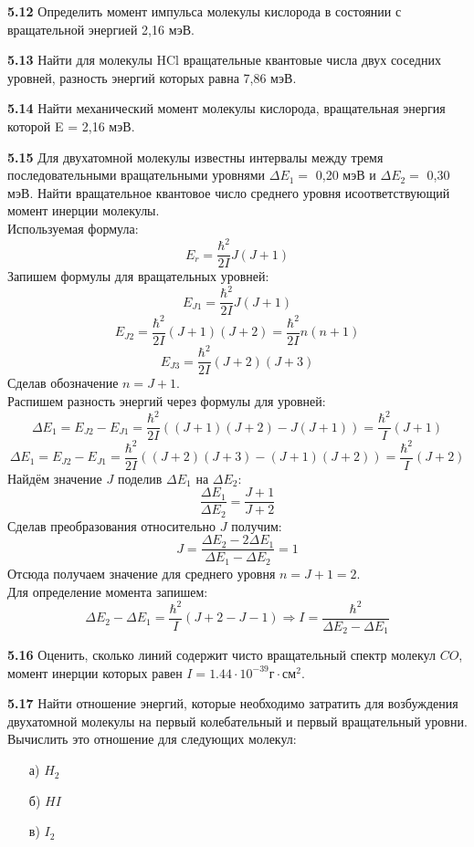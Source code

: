 	\textbf{5.12 }
		Определить момент импульса молекулы кислорода в состоянии с
		вращательной энергией 2,16 мэВ.

	\textbf{5.13 }
		Найти для молекулы HCl вращательные квантовые числа двух соседних
		уровней, разность энергий которых равна 7,86 мэВ.

	\textbf{5.14 }
		Найти механический момент молекулы кислорода, вращательная энергия
		которой E = 2,16 мэВ.

	\textbf{5.15 }
		Для двухатомной молекулы известны интервалы между тремя
		последовательными вращательными уровнями \( \Delta E_1 = \) 0,20 мэВ и
		\(\Delta E_2 = \) 0,30 мэВ. Найти вращательное квантовое число 
		среднего уровня исоответствующий момент инерции молекулы. \\
		Используемая формула: \[ E_r = \frac{\hbar^2}{2I}J(J+1) \]
		Запишем формулы для вращательных уровней:
		\[ E_{J1} = \frac{\hbar^2}{2I}J(J+1) \]
		\[ E_{J2} = \frac{\hbar^2}{2I}(J+1)(J+2) = \frac{\hbar^2}{2I}n(n+1) \]
		\[ E_{J3} = \frac{\hbar^2}{2I}(J+2)(J+3) \]
		Сделав обозначение \( n = J + 1 \). \\
		Распишем разность энергий через формулы для уровней:
		\[ 
			\Delta E_1 = E_{J2} - E_{J1} = 
			\frac{\hbar^2}{2I}((J+1)(J+2) - J(J+1)) = \frac{\hbar^2}{I}(J+1) 
		\]
		\[ 
			\Delta E_1 = E_{J2} - E_{J1} =
			\frac{\hbar^2}{2I}((J+2)(J+3)-(J+1)(J+2)) = \frac{\hbar^2}{I}(J+2)
		\]
		Найдём значение \( J \) поделив \( \Delta E_1 \) на \( \Delta E_2 \):
		\[ \frac{\Delta E_1}{\Delta E_2} = \frac{J+1}{J+2} \]
		Сделав преобразования относительно \( J \) получим:
		\[ J = \frac{\Delta E_2 - 2\Delta E_1}{\Delta E_1 - \Delta E_2} = 1 \]
		Отсюда получаем значение для среднего уровня \( n = J+1 = 2 \). \\
		Для определение момента запишем: 
		\[ 
			\Delta E_2 - \Delta E_1 = \frac{\hbar^2}{I}(J+2-J-1) 
			\Rightarrow I = \frac{\hbar^2}{\Delta E_2 - \Delta E_1}
		\]

	\textbf{5.16 }
		Оценить, сколько линий содержит чисто вращательный спектр молекул
		\( CO \), момент инерции которых равен 
		\( I = 1.44\cdot10^{-39} \text{г}\cdot\text{см}^2 \).

	\textbf{5.17 }
		Найти отношение энергий, которые необходимо затратить для
		возбуждения двухатомной молекулы на первый колебательный и первый
		вращательный уровни. Вычислить это отношение для следующих молекул:
		\vspace*{-1em} 
		\begin{itemize}\itemsep-8pt
			\item[а)] \( H_2 \)
			\item[б)] \( HI \)
			\item[в)] \( I_2 \)
		\end{itemize}
